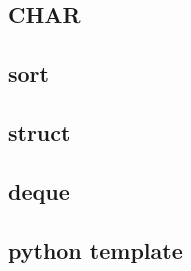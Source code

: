         \subsection{CHAR}
                
        \subsection{sort}
                
        \subsection{struct}
                
        \subsection{deque}
                
        \subsection{python template}
                    